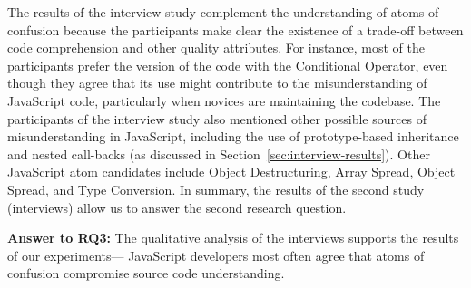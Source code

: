 The results of the interview study complement the understanding of atoms of confusion because the participants make clear the existence of a trade-off between
code comprehension and other quality attributes. For instance, most of the participants prefer the version of the code with the
Conditional Operator, even though they agree that its use might contribute to the misunderstanding of JavaScript code,
particularly when novices are maintaining the codebase. The participants of the interview study also
mentioned other possible sources of misunderstanding in JavaScript,
including the use of prototype-based inheritance and nested call-backs (as discussed in Section~\ref{sec:interview-results}). Other JavaScript atom candidates include
Object Destructuring, Array Spread, Object Spread, and Type Conversion.
In summary, the results of the second study (interviews) allow
us to answer the second research question.

\begin{mh}
  {\bf Answer to RQ3:} The qualitative analysis of the
  interviews supports the results of our experiments---
  JavaScript developers most often agree that atoms of confusion compromise
  source code understanding. 
\end{mh}




\subsection{}\label{sec:whytwo}

